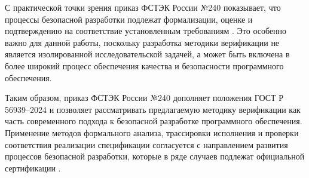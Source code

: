 С практической точки зрения приказ ФСТЭК России №240 показывает, что
процессы безопасной разработки подлежат формализации, оценке и
подтверждению на соответствие установленным требованиям
\cite{fstek_240_2023}. Это особенно важно для данной работы, поскольку
разработка методики верификации не является изолированной исследовательской
задачей, а может быть включена в более широкий процесс обеспечения
качества и безопасности программного обеспечения.

Таким образом, приказ ФСТЭК России №240 дополняет положения
ГОСТ Р 56939--2024 и позволяет рассматривать предлагаемую методику
верификации как часть современного подхода к безопасной разработке
программного обеспечения. Применение методов формального анализа,
трассировки исполнения и проверки соответствия реализации спецификации
согласуется с направлением развития процессов безопасной разработки,
которые в ряде случаев подлежат официальной сертификации
\cite{fstek_240_2023}.
